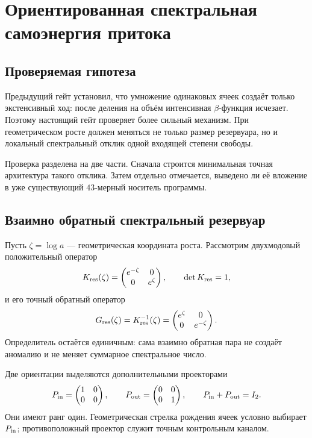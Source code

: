 \chapter{Ориентированная спектральная самоэнергия притока}
\label{ch:v10-inflow-spectral-self-energy-running-parent-origin}

\section{Проверяемая гипотеза}

Предыдущий гейт установил, что умножение одинаковых ячеек создаёт только
экстенсивный ход: после деления на объём интенсивная $\beta$-функция
исчезает. Поэтому настоящий гейт проверяет более сильный механизм. При
геометрическом росте должен меняться не только размер резервуара, но и
локальный спектральный отклик одной входящей степени свободы.

Проверка разделена на две части. Сначала строится минимальная точная
архитектура такого отклика. Затем отдельно отмечается, выведено ли её
вложение в уже существующий $43$-мерный носитель программы.

\section{Взаимно обратный спектральный резервуар}

Пусть $\zeta=\log a$ --- геометрическая координата роста. Рассмотрим
двухмодовый положительный оператор
\begin{equation}
 K_{\rm res}(\zeta)
 =\begin{pmatrix}e^{-\zeta}&0\\0&e^{\zeta}\end{pmatrix},
 \qquad
 \det K_{\rm res}=1,
 \label{eq:v10-reciprocal-reservoir}
\end{equation}
и его точный обратный оператор
\begin{equation}
 G_{\rm res}(\zeta)=K_{\rm res}^{-1}(\zeta)
 =\begin{pmatrix}e^{\zeta}&0\\0&e^{-\zeta}\end{pmatrix}.
 \label{eq:v10-reciprocal-propagator}
\end{equation}
Определитель остаётся единичным: сама взаимно обратная пара не создаёт
аномалию и не меняет суммарное спектральное число.

Две ориентации выделяются дополнительными проекторами
\begin{equation}
 P_{\rm in}=\begin{pmatrix}1&0\\0&0\end{pmatrix},
 \qquad
 P_{\rm out}=\begin{pmatrix}0&0\\0&1\end{pmatrix},
 \qquad P_{\rm in}+P_{\rm out}=I_2.
 \label{eq:v10-orientation-projectors}
\end{equation}
Они имеют ранг один. Геометрическая стрелка рождения ячеек условно выбирает
$P_{\rm in}$; противоположный проектор служит точным контрольным каналом.


